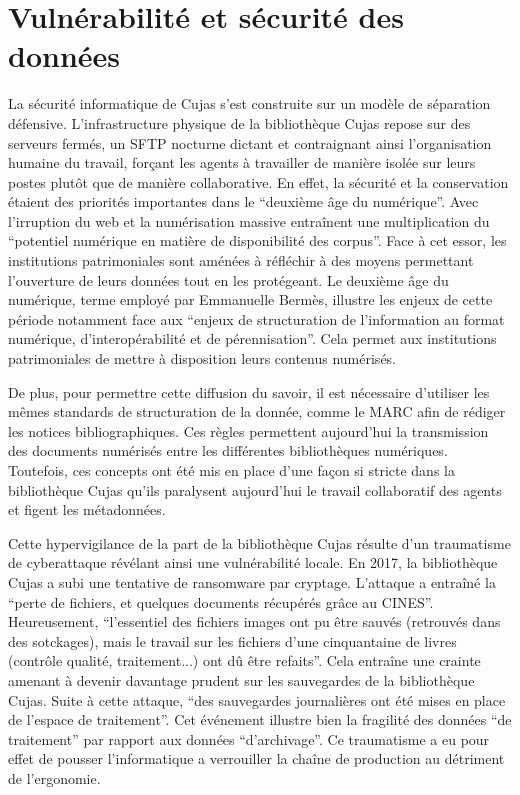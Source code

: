 \section{Vulnérabilité et sécurité des données}
La sécurité informatique de Cujas s'est construite sur un modèle de séparation défensive. L'infrastructure physique de la bibliothèque Cujas repose sur des serveurs fermés, un SFTP nocturne dictant et contraignant ainsi l'organisation humaine du travail, forçant les agents à travailler de manière isolée sur leurs postes plutôt que de manière collaborative. En effet, la sécurité et la conservation étaient des priorités importantes dans le \enquote{deuxième âge du numérique}. Avec l'irruption du web et la numérisation massive entraînent une multiplication du \enquote{potentiel numérique en matière de disponibilité des corpus}. Face à cet essor, les institutions patrimoniales sont aménées à réfléchir à des moyens permettant l'ouverture de leurs données tout en les protégeant. Le deuxième âge du numérique, terme employé par Emmanuelle Bermès, illustre les enjeux de cette période notamment face aux \enquote{enjeux de structuration de l'information au format numérique, d'interopérabilité et de pérennisation}. Cela permet aux institutions patrimoniales de mettre à disposition leurs contenus numérisés.

De plus, pour permettre cette diffusion du savoir, il est nécessaire d'utiliser les mêmes standards de structuration de la donnée, comme le MARC afin de rédiger les notices bibliographiques. Ces règles permettent aujourd'hui la transmission des documents numérisés entre les différentes bibliothèques numériques. Toutefois, ces concepts ont été mis en place d'une façon si stricte dans la bibliothèque Cujas qu'ils paralysent aujourd'hui le travail collaboratif des agents et figent les métadonnées. 

Cette hypervigilance de la part de la bibliothèque Cujas résulte d'un traumatisme de cyberattaque révélant ainsi une vulnérabilité locale. En 2017, la bibliothèque Cujas a subi une tentative de ransomware par cryptage. L'attaque a entraîné la \enquote{perte de fichiers, et quelques documents récupérés grâce au CINES}. Heureusement, \enquote{l'essentiel des fichiers images ont pu être sauvés (retrouvés dans des sotckages), mais le travail sur les fichiers d'une cinquantaine de livres (contrôle qualité, traitement...) ont dû être refaits}. Cela entraîne une crainte amenant à devenir davantage prudent sur les sauvegardes de la bibliothèque Cujas. Suite à cette attaque, \enquote{des sauvegardes journalières ont été mises en place de l'espace de traitement}. Cet événement illustre bien la fragilité des données \enquote{de traitement} par rapport aux données \enquote{d'archivage}. Ce traumatisme a eu pour effet de pousser l'informatique a verrouiller la chaîne de production au détriment de l'ergonomie. 

